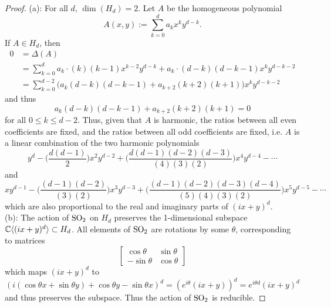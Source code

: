 \documentclass{amsart}
\begin{document}
	\begin{proof}
		(a): For all $d$, $\dim(H_d)=2$. Let $A$ be the homogeneous polynomial
		$$
		A(x,y) := \sum_{k=0}^d a_k x^ky^{d-k}.
		$$
		If $A\in H_d$, then 
		\begin{align*}
			0 &= \Delta(A)\\
		 &= \sum_{k=0}^d a_k \cdot (k)(k-1) x^{k-2}y^{d-k} + a_k\cdot (d-k)(d-k-1) x^ky^{d-k-2}\\
		&= \sum_{k=0}^{d-2} \Big(a_{k}(d-k)(d-k-1) + a_{k+2}(k+2)(k+1)\Big) x^ky^{d-k-2}
		\end{align*}
		and thus 
		$$
		a_{k}(d-k)(d-k-1) + a_{k+2}(k+2)(k+1) = 0
		$$
		for all $0\leq k \leq d-2$. Thus, given that $A$ is harmonic, the ratios between all even coefficients are fixed, and the ratios between all odd coefficients are fixed, i.e. $A$ is a linear combination of the two harmonic polynomials
		$$
		y^d - \Big(\frac{d(d-1)}{2}\Big)x^2y^{d-2} + \Big(\frac{d(d-1)(d-2)(d-3)}{(4)(3)(2)}\Big)x^4y^{d-4} - \cdots
		$$
		and 
		$$
		xy^{d-1} - \Big(\frac{(d-1)(d-2)}{(3)(2)}\Big)x^3y^{d-3} + \Big(\frac{(d-1)(d-2)(d-3)(d-4)}{(5)(4)(3)(2)}\Big)x^5y^{d-5} - \cdots 
		$$
		which are also proportional to the real and imaginary parts of $(ix+y)^d$.\\
		
		(b): The action of $\operatorname{SO}_2$ on $H_d$ preserves the 1-dimensional subspace $\mathbb{C}\langle(ix+y)^d\rangle\subset H_d$. All elements of $\operatorname{SO}_2$ are rotations by some $\theta$, corresponding to matrices
		$$
		\begin{bmatrix}
			\cos \theta & \sin \theta \\
			-\sin \theta & \cos\theta
		\end{bmatrix}
		$$
		which maps $(ix+y)^d$ to 
		$$
		(i(\cos\theta x + \sin\theta y) + \cos\theta y - \sin\theta x)^d = (e^{i\theta}(ix + y))^d = e^{i\theta d} (ix+y)^d
		$$
		and thus preserves the subspace. Thus the action of $\operatorname{SO}_2$ is reducible.
		
	\end{proof}
		
\end{document}
